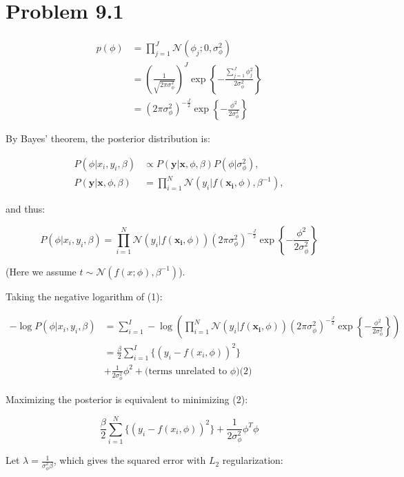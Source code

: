 \documentclass{article}
\begin{document}
\section*{Problem 9.1}

\[
\begin{aligned}
p(\phi) 
&= \prod_{j=1}^J \mathcal{N}(\phi_j; 0, \sigma_\phi^2) \\
&= \left(\frac{1}{\sqrt{2\pi\sigma_\phi^2}}\right)^J \exp\left\{-\frac{\sum_{j=1}^J{\phi_j^2}}{2\sigma_\phi^2}\right\} \\
&= (2\pi \sigma_\phi^2)^{-\frac{J}{2}} \exp\left\{-\frac{\phi^2}{2\sigma_\phi^2}\right\}
\end{aligned}
\]

By Bayes' theorem, the posterior distribution is:

\[
\begin{aligned}
P(\phi | x_i, y_i, \beta) &\propto P(\mathbf{y} | \mathbf{x}, \phi, \beta) P(\phi | \sigma_\phi^2), \\
P(\mathbf{y} | \mathbf{x}, \phi, \beta) &= \prod_{i=1}^N \mathcal{N}(y_i | f(\mathbf{x_i}, \phi), \beta^{-1}),
\end{aligned}
\]

and thus:

\[
P(\phi | x_i, y_i, \beta) = \prod_{i=1}^N \mathcal{N}(y_i | f(\mathbf{x_i}, \phi))(2\pi\sigma_\phi^2)^{-\frac{J}{2}} \exp\left\{-\frac{\phi^2}{2\sigma_\phi^2}\right\} \tag{1}
\]

(Here we assume \(t \sim \mathcal{N}(f(x;\phi), \beta^{-1})\)).

Taking the negative logarithm of (1):

\[
\begin{aligned}
- \log P(\phi | x_i, y_i, \beta) 
&= \sum_{i=1}^I -\log \left( \prod_{i=1}^N \mathcal{N}(y_i | f(\mathbf{x_i}, \phi))(2\pi\sigma_\phi^2)^{-\frac{J}{2}} \exp\left\{-\frac{\phi^2}{2\sigma_\phi^2}\right\} \right) \\
&= \frac{\beta}{2} \sum_{i=1}^I \{ (y_i - f(x_i, \phi))^2 \} \\
&+ \frac{1}{2\sigma_\phi^2} \phi^2 + \text{(terms unrelated to \(\phi\))} \text{(2)}
\end{aligned}
\]

Maximizing the posterior is equivalent to minimizing (2):

\[
\frac{\beta}{2} \sum_{i=1}^N \{ (y_i - f(x_i,\phi))^2\} + \frac{1}{2\sigma_\phi^2} \phi^T\phi
\]

Let \(\lambda = \frac{1}{\sigma_\phi^2\beta}\), which gives the squared error with \(L_2\) regularization:
\end{document}
